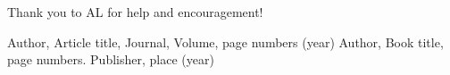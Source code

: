 \begin{acknowledgements}
Thank you to AL for help and encouragement! 
\end{acknowledgements}


%
%



\begin{thebibliography}{}
%
%
Author, Article title, Journal, Volume, page numbers (year)
Author, Book title, page numbers. Publisher, place (year)
\end{thebibliography}



